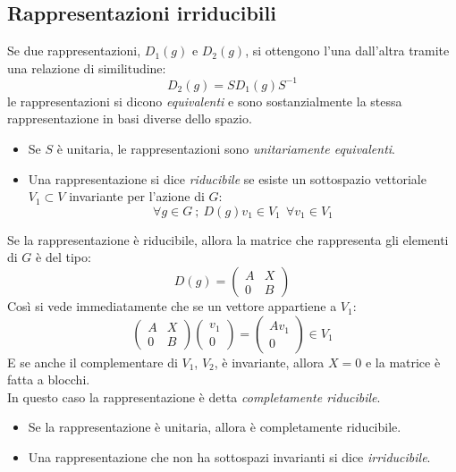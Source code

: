 \documentclass[twoside]{article}
\begin{document}
\vspace{0.5cm}
\subsection{Rappresentazioni irriducibili}
Se due rappresentazioni, $D_1(g)$ e $D_2(g)$, si ottengono l'una dall'altra tramite una relazione di similitudine:
\begin{equation}
    D_2(g)=SD_1(g)S^{-1}
\end{equation}
le rappresentazioni si dicono \textit{equivalenti} e sono sostanzialmente la stessa rappresentazione in basi diverse dello spazio.
\begin{itemize}
    \item Se $S$ è unitaria, le rappresentazioni sono \textit{unitariamente equivalenti}.
    \item Una rappresentazione si dice \textit{riducibile} se esiste un sottospazio vettoriale $V_1 \subset V$ invariante per l'azione di $G$:
    \begin{equation}
        \forall g \in G \ ; \ D(g)v_1 \in V_1 \ \ \forall v_1 \in V_1
    \end{equation}
\end{itemize}
Se la rappresentazione è riducibile, allora la matrice che rappresenta gli elementi di $G$ è del tipo:
\begin{equation}
    D(g)=\begin{pmatrix}
    A & X \\ 0 & B
    \end{pmatrix}
\end{equation}
Così si vede immediatamente che se un vettore appartiene a $V_1$:
\begin{equation}
    \begin{pmatrix}
    A & X \\ 0 & B
    \end{pmatrix} \begin{pmatrix}
    v_1 \\ 0
    \end{pmatrix} = \begin{pmatrix}
    Av_1 \\ 0
    \end{pmatrix} \in V_1
\end{equation}
E se anche il complementare di $V_1$, $V_2$, è invariante, allora $X=0$ e la matrice è fatta a blocchi.
\\
In questo caso la rappresentazione è detta \textit{completamente riducibile}.
\begin{itemize}
    \item Se la rappresentazione è unitaria, allora è completamente riducibile.
    \item Una rappresentazione che non ha sottospazi invarianti si dice \textit{irriducibile}.
\end{itemize}
\end{document}
